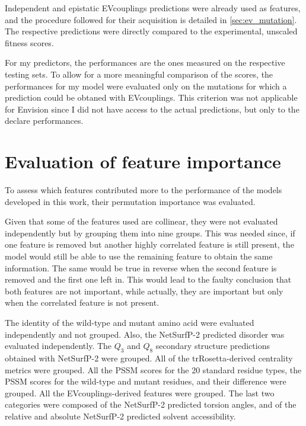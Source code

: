 Independent and epistatic EVcouplings predictions were already used as features, and the procedure followed for their acquisition is detailed in \autoref{sec:ev_mutation}.
The respective predictions were directly compared to the experimental, unscaled fitness scores.

For my predictors, the performances are the ones measured on the respective testing sets.
To allow for a more meaningful comparison of the scores, the performances for my model were evaluated only on the mutations for which a prediction could be obtaned with EVcouplings.
This criterion was not applicable for Envision since I did not have access to the actual predictions, but only to the declare performances.

\section{Evaluation of feature importance}\label{sec:mm_feature_importance}
To assess which features contributed more to the performance of the models developed in this work, their permutation importance was evaluated.

Given that some of the features used are collinear, they were not evaluated independently but by grouping them into nine groups.
This was needed since, if one feature is removed but another highly correlated feature is still present, the model would still be able to use the remaining feature to obtain the same information.
The same would be true in reverse when the second feature is removed and the first one left in.
This would lead to the faulty conclusion that both features are not important, while actually, they are important but only when the correlated feature is not present.

The identity of the wild-type and mutant amino acid were evaluated independently and not grouped.
Also, the NetSurfP-2 predicted disorder was evaluated independently.
The $Q_3$ and $Q_8$ secondary structure predictions obtained with NetSurfP-2 were grouped.
All of the trRosetta-derived centrality metrics were grouped.
All the PSSM scores for the \num{20} standard residue types, the PSSM scores for the wild-type and mutant residues, and their difference were grouped.
All the EVcouplings-derived features were grouped.
The last two categories were composed of the NetSurfP-2 predicted torsion angles, and of the relative and absolute NetSurfP-2 predicted solvent accessibility.

